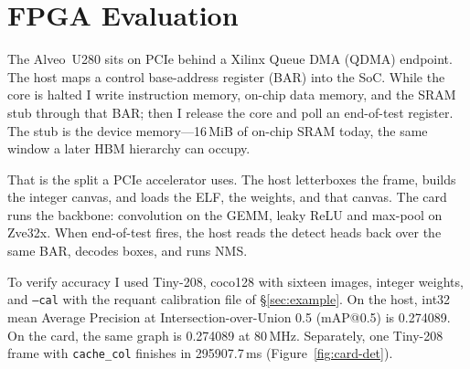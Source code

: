 \section{FPGA Evaluation}
\label{sec:eval}


The Alveo~{U280} sits on {PCIe} behind a {Xilinx} Queue {DMA} ({QDMA}) endpoint.
The host maps a control base-address register ({BAR}) into the {SoC}.
While the core is halted I write instruction memory, on-chip data
memory, and the {SRAM} stub through that {BAR}; then I release the
core and poll an end-of-test register.
The stub is the device memory---16\,{MiB} of on-chip {SRAM} today,
the same window a later {HBM} hierarchy can occupy.

That is the split a {PCIe} accelerator uses.
The host letterboxes the frame, builds the integer canvas, and loads
the {ELF}, the weights, and that canvas.
The card runs the backbone: convolution on the {GEMM}, leaky {ReLU}
and max-pool on {Zve32x}.
When end-of-test fires, the host reads the detect heads back over the
same {BAR}, decodes boxes, and runs {NMS}.

To verify accuracy I used Tiny-208, coco128 with sixteen images,
integer weights, and \texttt{--cal} with the requant calibration
file of \S\ref{sec:example}.
On the host, int32 mean Average Precision at
Intersection-over-Union 0.5 ({mAP@0.5}) is 0.274089.
On the card, the same graph is 0.274089 at 80\,{MHz}.
Separately, one Tiny-208 frame with \texttt{cache\_col} finishes
in 295907.7\,{ms} (Figure~\ref{fig:card-det}).
